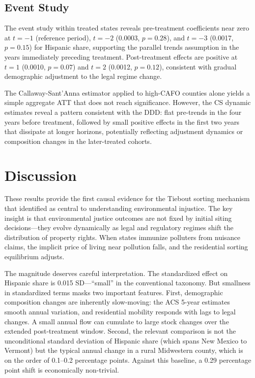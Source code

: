 \documentclass[12pt]{article}
\begin{document}
\subsection{Event Study}

The event study within treated states reveals pre-treatment coefficients near zero at $t = -1$ (reference period), $t = -2$ (0.0003, $p = 0.28$), and $t = -3$ (0.0017, $p = 0.15$) for Hispanic share, supporting the parallel trends assumption in the years immediately preceding treatment. Post-treatment effects are positive at $t = 1$ (0.0010, $p = 0.07$) and $t = 2$ (0.0012, $p = 0.12$), consistent with gradual demographic adjustment to the legal regime change.

The Callaway-Sant'Anna estimator applied to high-CAFO counties alone yields a simple aggregate ATT that does not reach significance. However, the CS dynamic estimates reveal a pattern consistent with the DDD: flat pre-trends in the four years before treatment, followed by small positive effects in the first two years that dissipate at longer horizons, potentially reflecting adjustment dynamics or composition changes in the later-treated cohorts.

\section{Discussion}

These results provide the first causal evidence for the Tiebout sorting mechanism that \citet{banzhaf2019environmental} identified as central to understanding environmental injustice. The key insight is that environmental justice outcomes are not fixed by initial siting decisions---they evolve dynamically as legal and regulatory regimes shift the distribution of property rights. When states immunize polluters from nuisance claims, the implicit price of living near pollution falls, and the residential sorting equilibrium adjusts.

The magnitude deserves careful interpretation. The standardized effect on Hispanic share is 0.015 SD---``small'' in the conventional taxonomy. But smallness in standardized terms masks two important features. First, demographic composition changes are inherently slow-moving: the ACS 5-year estimates smooth annual variation, and residential mobility responds with lags to legal changes. A small annual flow can cumulate to large stock changes over the extended post-treatment window. Second, the relevant comparison is not the unconditional standard deviation of Hispanic share (which spans New Mexico to Vermont) but the typical annual change in a rural Midwestern county, which is on the order of 0.1--0.2 percentage points. Against this baseline, a 0.29 percentage point shift is economically non-trivial.
\end{document}
